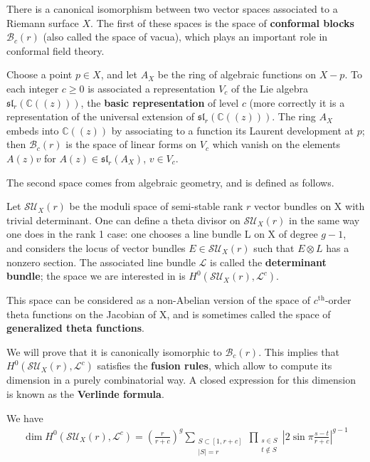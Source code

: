 \documentclass[12pt]{article}
\begin{document}
There is a canonical isomorphism between two vector spaces associated to a Riemann surface $X$. The first of these spaces is the space of \textbf{conformal blocks} $\mathcal{B}_c(r)$ (also called the space of vacua), which plays an important role in
conformal field theory.

\begin{definition}
    Choose a point $p \in X$, and let $A_X$ be the ring of algebraic functions on $X - p$. To each integer $c \geq 0$ is associated a representation $V_c$ of the Lie algebra $\mathfrak{sl}_r(\mathbb{C}((z)))$, the \textbf{basic representation} of level $c$ (more correctly it is a representation of the universal extension of $\mathfrak{sl}_r(\mathbb{C}((z)))$. The ring $A_X$ embeds into $\mathbb{C}((z))$ by associating to a function its Laurent development at $p$; then $\mathcal{B}_c(r)$ is the space of linear forms on $V_c$ which vanish on the elements $A(z)v$ for $A(z) \in \mathfrak{sl}_r(A_X)$, $v \in V_c$.
\end{definition}

The second space comes from algebraic geometry, and is defined as follows.

\begin{definition}
    Let $\mathcal{SU}_X(r)$ be the moduli space of semi-stable rank $r$ vector bundles on X with trivial
    determinant. One can define a theta divisor on $\mathcal{SU}_X(r)$ in the same way one does in the rank 1 case: one chooses a line bundle L on X of degree $g - 1$, and considers
    the locus of vector bundles $E \in \mathcal{SU}_X(r)$ such that $E \otimes L$ has a nonzero section. The
    associated line bundle $\mathcal{L}$ is called the \textbf{determinant bundle}; the space we are interested in
    is $H^0(\mathcal{SU}_X(r), \mathcal{L}^c)$.
\end{definition}
This space can be considered as a non-Abelian version of the space
of $c^{\text{th}}$-order theta functions on the Jacobian of X, and is sometimes called the space of \textbf{generalized theta functions}.

We will prove that it is canonically isomorphic to $\mathcal{B}_c(r)$. This implies that $H^0(\mathcal{SU}_X(r), \mathcal{L}^c)$ satisfies the \textbf{fusion rules}, which allow to compute its dimension in a purely combinatorial way. A closed expression for this dimension is known as the \textbf{Verlinde formula}.

\begin{theorem}
     We have \begin{align*}
        \dim H^0(\mathcal{SU}_X(r), \mathcal{L}^c) = \left( \frac{r}{r+c} \right)^g \sum_{\substack{S \subset [1,r+c] \\ |S|=r}} \prod_{\substack{s \in S \\ t \notin S}} \left| 2 \sin \pi \frac{s-t}{r+c} \right|^{g-1}
    \end{align*}
\end{theorem}
\end{document}
